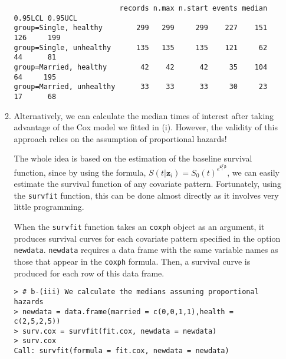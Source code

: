\begin{enumerate}[(a)]
\begin{enumerate}
\begin{footnotesize}
\begin{verbatim}
                         records n.max n.start events median 0.95LCL 0.95UCL
group=Single, healthy        299   299     299    227    151     126     199
group=Single, unhealthy      135   135     135    121     62      44      81
group=Married, healthy        42    42      42     35    104      64     195
group=Married, unhealthy      33    33      33     30     23      17      68
\end{verbatim}
\end{footnotesize}
\item Alternatively, we can calculate the median times of interest after taking advantage of the Cox model we fitted in (i). However, the validity of this approach relies on the assumption of proportional hazards!

The whole idea is based on the estimation of the baseline survival function, since by using the formula, $S(t|\mathbf{z}_{i})=S_{0}(t)^{e^{\mathbf{z}_{i}^{T}\boldsymbol{\beta}}}$, we can easily estimate the survival function of any covariate pattern. Fortunately, using the \verb|survfit| function, this can be done almost directly as it involves very little programming.

When the \verb|survfit| function takes an \verb|coxph| object as an argument, it produces survival curves for each covariate pattern specified in the option \verb|newdata|. \verb|newdata| requires a data frame with the same variable names as those that appear in the \verb|coxph| formula. Then, a survival curve is produced for each row of this data frame. 
\begin{footnotesize}
\begin{verbatim}
> # b-(iii) We calculate the medians assuming proportional hazards
> newdata = data.frame(married = c(0,0,1,1),health = c(2,5,2,5))
> surv.cox = survfit(fit.cox, newdata = newdata)
> surv.cox
Call: survfit(formula = fit.cox, newdata = newdata)


\end{verbatim}
\end{footnotesize}
\end{enumerate}
\end{enumerate}
